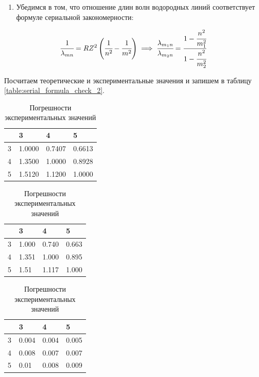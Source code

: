 \documentclass[a4paper,12pt]{article}
\begin{document}
\begin{enumerate}[resume]
    \item Убедимся в том, что отношение длин волн водородных линий соответствует формуле сериальной закономерности:
\end{enumerate}

\begin{equation*}
    \cfrac{1}{\lambda_{mn}} = R Z^2 \left( \cfrac{1}{n^2} - \cfrac{1}{m^2} \right) \implies \cfrac{\lambda_{m_1 n}}{\lambda_{m_2 n}} = \cfrac{1 - \cfrac{n^2}{m_1^2}}{1 - \cfrac{n^2}{m_2^2}}
\end{equation*}

Посчитаем теоретические и экспериментальные значения и запишем в таблицу \ref{table:serial_formula_check_2}.


\FloatBarrier
\begin{table}[!h]
    \centering
    \begin{minipage}{0.48\textwidth}
        \centering
        \begin{tabular}{|l|lll|}
            \hline
            ~ & 3      & 4      & 5      \\ \hline
            3 & 1.0000 & 0.7407 & 0.6613 \\ 
            4 & 1.3500 & 1.0000 & 0.8928 \\
            5 & 1.5120 & 1.1200 & 1.0000 \\ \hline
        \end{tabular}
        \caption{Теоретические значения}
        \label{table:serial_formula_check_1}
    \end{minipage}%
    \hfill
    \begin{minipage}{0.48\textwidth}
        \centering
        \begin{tabular}{|l|lll|}
            \hline
            ~ & 3     & 4     & 5     \\ \hline
            3 & 1.000 & 0.740 & 0.663 \\ 
            4 & 1.351 & 1.000 & 0.895 \\
            5 & 1.51  & 1.117 & 1.000 \\ \hline
        \end{tabular}
        \caption{Экспериментальные значения}
        \label{table:serial_formula_check_2}
    \end{minipage}%
    \begin{minipage}{0.48\textwidth}
        \centering
        \begin{tabular}{|l|lll|}
            \hline
            ~ & 3     & 4     & 5     \\ \hline
            3 & 0.004 & 0.004 & 0.005 \\ 
            4 & 0.008 & 0.007 & 0.007 \\
            5 & 0.01  & 0.008 & 0.009 \\ \hline
        \end{tabular}
        \caption{Погрешности экспериментальных значений}
        \label{table:serial_formula_check_3}
    \end{minipage}
\end{table}
\FloatBarrier
\end{document}
